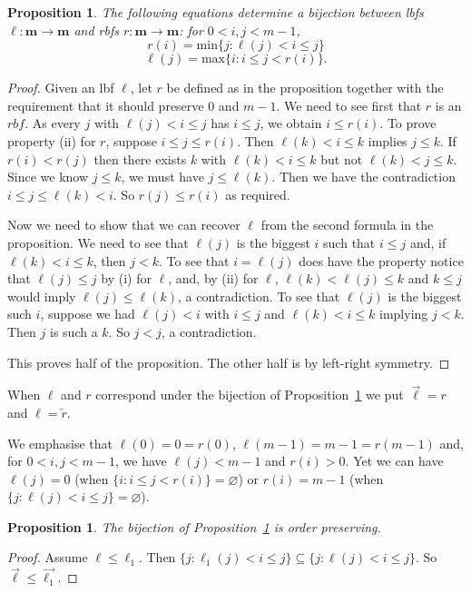 \documentclass[a4paper,12pt,reqno]{amsart}
\newtheorem{proposition}[theorem]{Proposition}
\theoremstyle{definition}
\theoremstyle{fact}
\theoremstyle{genquest}
\theoremstyle{step}
\newcommand{\lra}{\longrightarrow}
\newcommand{\ola}{\overleftarrow}
\newcommand{\ora}{\overrightarrow}
\def\ordm{{\mathbf{m}}}
\begin{document}
\begin{proposition}\label{bijbf}
The following equations determine a bijection between lbfs $\ell:\ordm \lra \ordm$ 
and rbfs $r:\ordm \lra \ordm$: for $0<i,j<m-1$,
$$r(i) = \mathrm{min} \{j : \ell(j) < i \le j \}$$
$$\ell(j) = \mathrm{max} \{i : i \le j < r(i) \} .$$
\end{proposition}
\begin{proof} 
Given an lbf $\ell$, let $r$ be defined as in the proposition 
together with the requirement that it should preserve $0$ and $m-1$. 
We need to see first that $r$ is an $rbf$.
As every $j$ with $\ell(j) < i \le j$ has $i \le j$, we obtain $i \le r(i)$.  
To prove property (ii) for $r$, suppose $i\le j\le r(i)$.
Then $\ell(k)<i \le k$ implies $j\le k$. If $r(i) < r(j)$ then there exists
$k$ with $\ell(k)< i\le k$ but not $\ell(k)< j\le k$. Since we know $j\le k$,
we must have $j \le \ell(k)$. Then we have the contradiction
$i\le j\le \ell(k) < i$. So $r(j) \le r(i)$ as required.

Now we need to show that we can recover $\ell$ from the second formula in the
proposition. We need to see that $\ell(j)$ is the biggest $i$ such that $i\le j$ and, if
$\ell(k) < i \le k$, then $j<k$. To see that $i = \ell(j)$ does have the property notice that
$\ell(j) \le j$ by (i) for $\ell$, and, by (ii) for $\ell$, $\ell(k) < \ell(j) \le k$ and 
$k\le j$ would imply $\ell(j)\le \ell(k)$, a contradiction. 
To see that $\ell(j)$ is the biggest such $i$, suppose we had
$\ell(j) < i$ with $i\le j$ and $\ell(k) < i \le k$ implying $j<k$. Then $j$ is such a $k$.
So $j<j$, a contradiction.

This proves half of the proposition. The other half is by left-right symmetry.  
\end{proof}

When $\ell$ and $r$ correspond under the bijection of Proposition~\ref{bijbf}
we put $\ora{\ell} = r$ and $\ell=\ola{r}$.

We emphasise that $\ell(0)=0=r(0)$, $\ell(m-1)=m-1=r(m-1)$ and, for $0<i,j<m-1$,
we have $\ell(j)< m-1$ and $r(i)>0$. 
Yet we can have $\ell(j)=0$ 
(when $\{i : i \le j < r(i) \}=\varnothing$) or $r(i)=m-1$ 
(when $\{j : \ell(j) < i \le j \}=\varnothing$).

\begin{proposition}\label{ordbf}
The bijection of Proposition~\ref{bijbf} is order preserving.
\end{proposition}
\begin{proof}
Assume $\ell \le \ell_1$. Then $\{ j : \ell_1 (j)< i\le j \} \subseteq \{j: \ell (j)< i \le j\} $.
So $\ora{\ell} \le \ora{\ell_1}$.
\end{proof}
\end{document}
